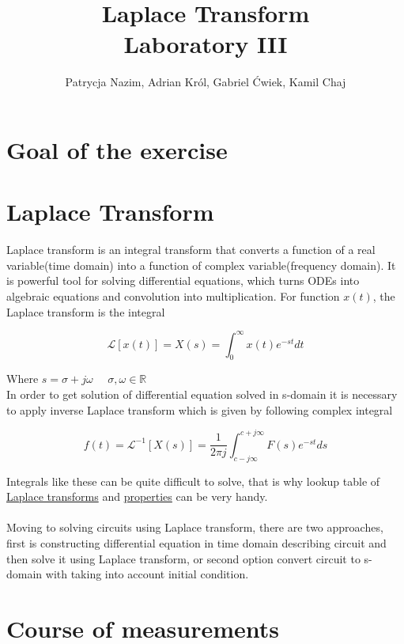 \documentclass[notitlepage, a4paper, 11pt]{article}
\title{Laplace Transform\\
	\large Laboratory III}
\author{Patrycja Nazim, Adrian Król, Gabriel Ćwiek, Kamil Chaj}
\date{}
\begin{document}
	\maketitle
	\section{Goal of the exercise}
	\section{Laplace Transform}
	Laplace transform is an integral transform that converts a function of a real variable(time domain) into a function of complex variable(frequency domain). It is powerful tool for solving differential equations, which turns ODEs into algebraic equations and convolution into multiplication. For function $x(t)$, the Laplace transform is the integral
	
	\begin{equation}
		\mathcal{L}[x(t)] = X(s) = \int_{0}^{\infty}x(t)e^{-st}dt
	\end{equation}
	
	Where $s = \sigma+j\omega$ $\quad \sigma,\omega\in \mathbb{R}$
	\\
	In order to get solution of differential equation solved in s-domain it is necessary to apply inverse Laplace transform which is given by following complex integral
	
	\begin{equation}
		f(t) = \mathcal{L}^{-1}[X(s)] = \dfrac{1}{2\pi j}\int_{c-j\infty}^{c+j\infty}F(s)e^{-st}ds
	\end{equation}
	
	Integrals like these can be quite difficult to solve, that is why lookup table of \href{https://en.wikipedia.org/wiki/Laplace_transform#Table_of_selected_Laplace_transforms}{Laplace transforms} and \href{https://en.wikipedia.org/wiki/Laplace_transform#Properties_and_theorems}{properties} can be very handy.
	\\ \\
	Moving to solving circuits using Laplace transform, there are two approaches, first is constructing differential equation in time domain describing circuit and then solve it using Laplace transform, or second option convert circuit to s-domain with taking into account initial condition.
	
	
	\section{Course of measurements}
		
\end{document}

